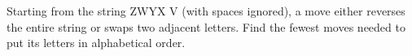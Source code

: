 Starting from the string ZWYX V (with spaces ignored), a move either reverses the entire string or swaps two adjacent letters. Find the fewest moves needed to put its letters in alphabetical order.
